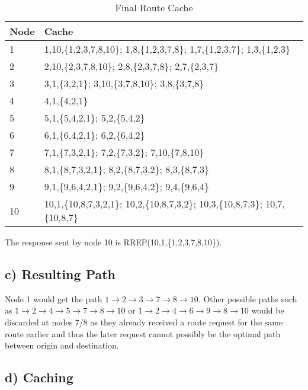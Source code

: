 \documentclass[a4paper, 11 pt, article, accentcolor=tud7b]{tudreport}
\begin{document}
	\begin{table}[h]
	  \centering
	  \begin{tabular}{| l | l |}
	    \hline
	    Node & Cache \\ \hline
	    1    & 1,10,\{1,2,3,7,8,10\}; 1,8,\{1,2,3,7,8\}; 1,7,\{1,2,3,7\}; 1,3,\{1,2,3\}\\ \hline
	    2    & 2,10,\{2,3,7,8,10\}; 2,8,\{2,3,7,8\}; 2,7,\{2,3,7\}\\ \hline
	    3    & 3,1,\{3,2,1\}; 3,10,\{3,7,8,10\}; 3,8,\{3,7,8\}\\ \hline
	    4    & 4,1,\{4,2,1\}\\ \hline
	    5    & 5,1,\{5,4,2,1\}; 5,2,\{5,4,2\}\\ \hline
	    6    & 6,1,\{6,4,2,1\}; 6,2,\{6,4,2\}\\ \hline
	    7    & 7,1,\{7,3,2,1\}; 7,2,\{7,3,2\}; 7,10,\{7,8,10\}\\ \hline
	    8    & 8,1,\{8,7,3,2,1\}; 8,2,\{8,7,3,2\}; 8,3,\{8,7,3\}\\ \hline
	    9    & 9,1,\{9,6,4,2,1\}; 9,2,\{9,6,4,2\}; 9,4,\{9,6,4\}\\ \hline
	    10   & 10,1,\{10,8,7,3,2,1\}; 10,2,\{10,8,7,3,2\}; 10,3,\{10,8,7,3\}; 10,7,\{10,8,7\}\\ \hline
	  \end{tabular}
	  \caption{Final Route Cache}
	\end{table}
	
	The response sent by node 10 is RREP(10,1,\{1,2,3,7,8,10\}).
	
	\subsection*{c) Resulting Path}
	
	Node 1 would get the path $1 \rightarrow 2 \rightarrow 3 \rightarrow 7 \rightarrow 8 \rightarrow 10$. Other possible paths such as $1 \rightarrow 2 \rightarrow 4 \rightarrow 5 \rightarrow 7 \rightarrow 8 \rightarrow 10$ or $1 \rightarrow 2 \rightarrow 4 \rightarrow 6 \rightarrow 9 \rightarrow 8 \rightarrow 10$ would be discarded at nodes 7/8 as they already received a route request for the same route earlier and thus the later request cannot possibly be the optimal path between origin and destination.
	
	\subsection*{d) Caching}
	
\end{document}
